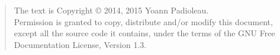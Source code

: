 \begin{quote}
The text is Copyright \copyright{} 2014, 2015 Yoann Padioleau.\\
Permission is granted to copy, distribute and/or modify this document,
except all the source code it contains, under the terms of the GNU Free
Documentation License, Version 1.3.
\end{quote}
